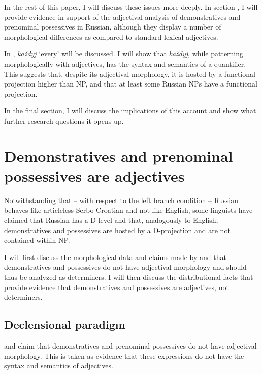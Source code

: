 \documentclass[output=paper,
colorlinks,
citecolor=brown,
newtxmath
]{langscibook}
\begin{document}
In the rest of this paper, I will discuss these issues more deeply. In section , I will provide evidence in support of the adjectival analysis of demonstratives and prenominal possessives in Russian, %
although they display a number of morphological differences as compared to standard lexical adjectives.

In , \textit{každyj} `every' will be discussed. I will show that \textit{každyj}, %
while patterning morphologically with adjectives, has the syntax and semantics of a quantifier. This suggests that, despite its adjectival morphology, it is hosted by a functional projection higher than NP, and that at least some Russian NPs have a functional projection.

In the final section, I will discuss the implications of this account and show what further research questions it opens up.   
%
%
\section{Demonstratives and prenominal possessives are adjectives}\label{adjectives}

Notwithstanding that -- with respect to the left branch condition -- Russian behaves like articleless Serbo-Croatian and not like English, some linguists have claimed that Russian has a D-level and that, analogously to English, demonstratives and possessives are hosted by a D-projection and are not contained within NP. 

I will first discuss the morphological data and claims made by \citet{Babyonyshev1997} and \citet{Pereltsvaig2007} that demonstratives and possessives do not have adjectival morphology and should thus be analyzed as determiners. I will then discuss the distributional facts that provide evidence that demonstratives and possessives are adjectives, not determiners.  

\subsection{Declensional paradigm}

\citet{Babyonyshev1997} and \citet{Pereltsvaig2007} claim that demonstratives and pre\-nominal possessives do not have adjectival morphology. This is taken as evidence that these expressions do not have the syntax and semantics of adjectives.  
\end{document}
